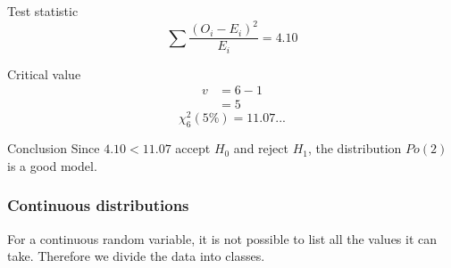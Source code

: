\begin{example}
\begin{step}{Test statistic}
        $$
        \sum{\frac{(O_i - E_i)^2}{E_i}} = 4.10
        $$
        \end{step}

        \begin{step}{Critical value}
        \begin{align*}
        v &= 6 - 1 \\
        &= 5
        \end{align*}
        $$
        \chi^2_6(5\%) = 11.07...
        $$
        \end{step}

        \begin{step}{Conclusion}
        Since $4.10 < 11.07$ accept $H_0$ and reject $H_1$, the distribution $Po(2)$ is a good model.
        \end{step}
        \end{example}

    \subsubsection{Continuous distributions}
        For a continuous random variable, it is not possible to list all the values it can take. Therefore we divide the data into classes. 


